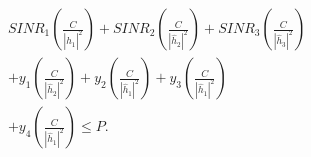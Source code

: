 \documentclass[preview]{standalone}
\begin{document}
\begin{align*}
SINR_1 \left( \frac{C}{\left|{\hat{h}_1}\right|^2} \right) + SINR_2 \left( \frac{C}{\left|{\hat{h}_2}\right|^2} \right) + SINR_3 \left( \frac{C}{\left|{\hat{h}_3}\right|^2} \right) \\ + y_1 \left( \frac{C}{\left|{\hat{h}_2}\right|^2} \right) + y_2 \left( \frac{C}{\left|{\hat{h}_1}\right|^2} \right) + y_3 \left( \frac{C}{\left|{\hat{h}_1}\right|^2} \right) \\ + y_4 \left( \frac{C}{\left|{\hat{h}_1}\right|^2} \right) \leq P.
\end{align*}
\end{document}
